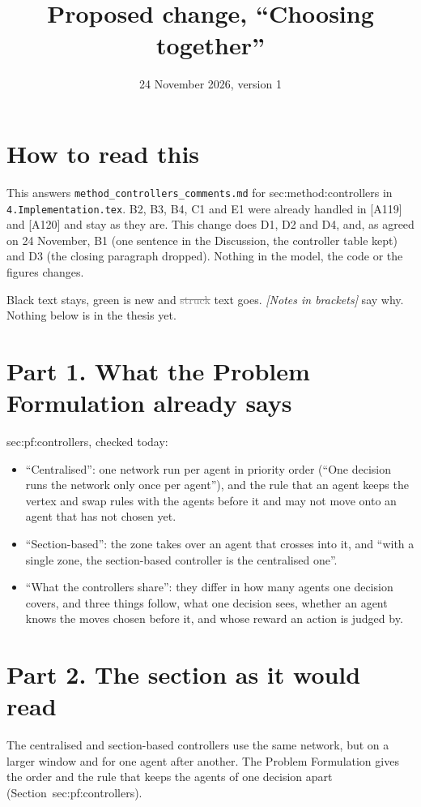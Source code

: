\documentclass[11pt,a4paper]{article}
\title{Proposed change, ``Choosing together''}
\date{24 November 2026, version 1}
\newcommand{\new}[1]{\textcolor{newc}{#1}}
\newcommand{\old}[1]{\textcolor{gray}{\sout{#1}}}
\newcommand{\note}[1]{{\small\itshape [#1]}}
\newcommand{\lab}[1]{\textsf{\footnotesize #1}}
\renewcommand{\ref}[1]{\lab{#1}}
\begin{document}
\sloppy
\maketitle

\section*{How to read this}
This answers \texttt{method\_controllers\_comments.md} for
\lab{sec:method:controllers} in \texttt{4.Implementation.tex}. B2, B3, B4, C1
and E1 were already handled in [A119] and [A120] and stay as they are. This
change does D1, D2 and D4, and, as agreed on 24 November, B1 (one sentence
in the Discussion, the controller table kept) and D3 (the closing paragraph
dropped). Nothing in the model, the code or the figures changes.

Black text stays, \new{green} is new and \old{struck} text goes.
\note{Notes in brackets} say why. Nothing below is in the thesis yet.

\section*{Part 1. What the Problem Formulation already says}
\lab{sec:pf:controllers}, checked today:
\begin{itemize}[nosep]
  \item ``Centralised'': one network run per agent in priority order
    (``One decision runs the network only once per agent''), and the rule
    that an agent keeps the vertex and swap rules with the agents before
    it and may not move onto an agent that has not chosen yet.
  \item ``Section-based'': the zone takes over an agent that crosses into it,
    and ``with a single zone, the section-based controller is the
    centralised one''.
  \item ``What the controllers share'': they differ in how many agents one
    decision covers, and three things follow, what one decision sees,
    whether an agent knows the moves chosen before it, and whose reward an
    action is judged by.
\end{itemize}

\section*{Part 2. The section as it would read}

The centralised and section-based controllers use the same network, but
on a larger window and for one agent after another. The Problem Formulation
gives the order and the rule that keeps the agents of one decision apart
(Section~\ref{sec:pf:controllers}).
\end{document}
